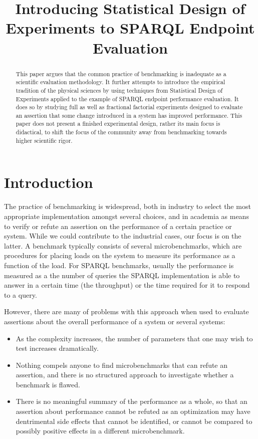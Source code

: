 \documentclass{article}
\title{Introducing Statistical Design of Experiments to SPARQL
  Endpoint Evaluation}
\begin{document}
\maketitle

\begin{abstract}
This paper argues that the common practice of benchmarking is
inadequate as a scientific evaluation methodology. It further attempts
to introduce the empirical tradition of the physical sciences by using
techniques from Statistical Design of Experiments applied to the
example of SPARQL endpoint performance evaluation. It does so by
studying full as well as fractional factorial experiments designed to
evaluate an assertion that some change introduced in a system has
improved performance. This paper does not present a finished
experimental design, rather its main focus is didactical, to shift the
focus of the community away from benchmarking towards higher
scientific rigor.
\end{abstract}

\section{Introduction}

The practice of benchmarking is widespread, both in industry to select
the most appropriate implementation amongst several choices, and in
academia as means to verify or refute an assertion on the performance
of a certain practice or system. While we could contribute to the
industrial cases, our focus is on the latter. A benchmark typically
consists of several microbenchmarks, which are procedures for placing
loads on the system to measure its performance as a function of the
load. For SPARQL benchmarks, usually the performance is measured as a
the number of queries the SPARQL implementation is able to answer in a
certain time (the throughput) or the time required for it to respond
to a query.

However, there are many of problems with this approach when used to
evaluate assertions about the overall performance of a system or
several systems: 
\begin{itemize}
\item As the complexity increases, the number of parameters that
one may wish to test increases dramatically.
\item Nothing compels anyone to find microbenchmarks that
  can refute an assertion, and there is no structured approach to
  investigate whether a benchmark is flawed.
\item There is no meaningful summary of the performance as a whole, so
  that an assertion about performance cannot be refuted as an
  optimization may have dentrimental side effects that cannot be
  identified, or cannot be compared to possibly positive effects in a
  different microbenchmark.
\end{itemize}
\end{document}
